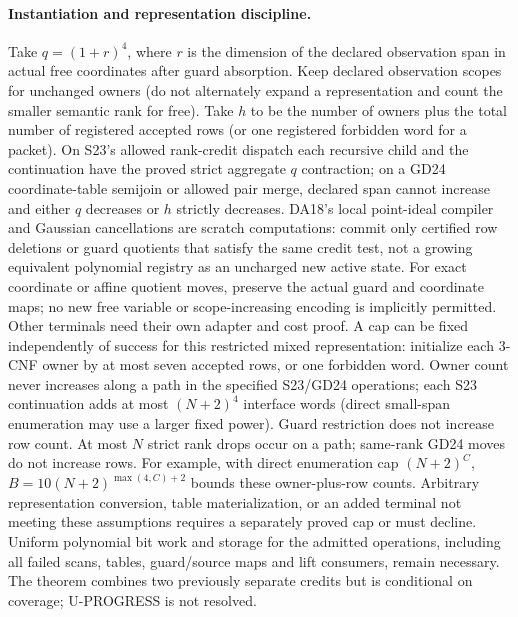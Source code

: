 \documentclass[11pt]{article}
\begin{document}
\paragraph{Instantiation and representation discipline.}
Take $q=(1+r)^4$, where $r$ is the dimension of the declared observation span in actual free coordinates after guard absorption. Keep declared observation scopes for unchanged owners (do not alternately expand a representation and count the smaller semantic rank for free). Take $h$ to be the number of owners plus the total number of registered accepted rows (or one registered forbidden word for a packet). On S23's allowed rank-credit dispatch each recursive child and the continuation have the proved strict aggregate $q$ contraction; on a GD24 coordinate-table semijoin or allowed pair merge, declared span cannot increase and either $q$ decreases or $h$ strictly decreases. DA18's local point-ideal compiler and Gaussian cancellations are scratch computations: commit only certified row deletions or guard quotients that satisfy the same credit test, not a growing equivalent polynomial registry as an uncharged new active state. For exact coordinate or affine quotient moves, preserve the actual guard and coordinate maps; no new free variable or scope-increasing encoding is implicitly permitted. Other terminals need their own adapter and cost proof. A cap can be fixed independently of success for this restricted mixed representation: initialize each 3-CNF owner by at most seven accepted rows, or one forbidden word. Owner count never increases along a path in the specified S23/GD24 operations; each S23 continuation adds at most $(N+2)^4$ interface words (direct small-span enumeration may use a larger fixed power). Guard restriction does not increase row count. At most $N$ strict rank drops occur on a path; same-rank GD24 moves do not increase rows. For example, with direct enumeration cap $(N+2)^C$, $B=10(N+2)^{\max(4,C)+2}$ bounds these owner-plus-row counts. Arbitrary representation conversion, table materialization, or an added terminal not meeting these assumptions requires a separately proved cap or must decline. Uniform polynomial bit work and storage for the admitted operations, including all failed scans, tables, guard/source maps and lift consumers, remain necessary. The theorem combines two previously separate credits but is conditional on coverage; U-PROGRESS is not resolved.
\end{document}
